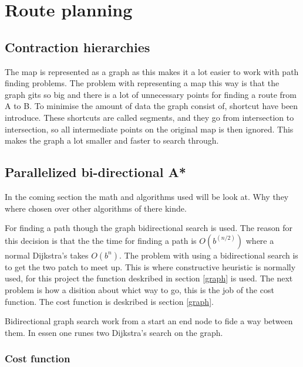 \section{Route planning}

\subsection{Contraction hierarchies}\label{contraction-hierarchies}
The map is represented as a graph as this makes it a lot easier to work with path finding problems. The problem with representing a map this way is that the graph gits so big and there is a lot of unnecessary points for finding a route from A to B. To minimise the amount of data the graph consist of, shortcut have been introduce. These shortcuts are called segments, and they go from intersection to intersection, so all intermediate points on the original map is then ignored. This makes the graph a lot smaller and faster to search through.

\subsection{Parallelized bi-directional A*} \label{algorithms}
In the coming section the math and algorithms used will be look at. Why they where chosen over other algorithms of there kinde.

For finding a path though the graph bidirectional search is used. The reason for this decision is that the the time for finding a path is $O(b^{(n/2)})$ where a normal Dijkstra’s takes $O(b^{n})$. The problem with using a bidirectional search is to get the two patch to meet up. This is where constructive heuristic is normally used, for this project the function deskribed in section \ref{graph} is used. The next problem is how a disition about whict way to go, this is the job of the cost function. The cost function is deskribed is section \ref{graph}.

Bidirectional graph search work from a start an end node to fide a way between them. In essen one runes two Dijkstra's search on the graph.

\subsubsection{Cost function}
